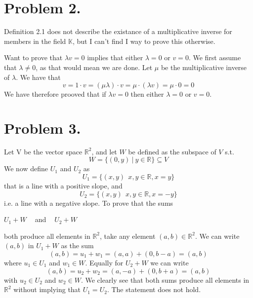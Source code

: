 \documentclass[a4paper,11pt,norsk]{article}
\begin{document}
\section*{Problem 2.}
Definition 2.1 does not describe the existance of a multiplicative inverse for members in the field $\mathbb{K}$, but 
I can't find I way to prove this otherwise.

Want to prove that $\lambda v = 0$ implies that either $\lambda = 0$ or $v = 0$. We first assume that $\lambda \neq 0$, as that 
would mean we are done. Let $\mu$ be the multiplicative inverse of $\lambda$. We have that 
$$v = 1 \cdot v = (\mu \lambda) \cdot v = \mu \cdot (\lambda v) = \mu \cdot 0 = 0$$
We have therefore prooved that if $\lambda v = 0$ then either $\lambda = 0$ or $v = 0$.

\section*{Problem 3.}
Let V be the vector space $\mathbb{R}^2$, and let $W$ be defined as the subspace of $V$ s.t. 
$$W = \{(0, y) \:|\: y \in \mathbb{R}\} \subseteq V$$
We now define $U_1$ and $U_2$ as 
$$U_1 = \{ (x, y) \:\: x, y \in \mathbb{R}, x = y \}$$
that is a line with a positive slope, and 
$$U_2 = \{ (x, y) \:\: x, y \in \mathbb{R}, x = -y \}$$
i.e. a line with a negative slope. To prove that the sums
\begin{center}
    $U_1 + W\:\:\:\:$ and $\:\:\:\:U_2 + W$
\end{center}
both produce all elements in $\mathbb{R}^2$, take any element $(a, b) \in \mathbb{R}^2$. 
We can write $(a, b)$ in $U_1 + W$ as the sum
$$(a, b) = u_1 + w_1 = (a, a) + (0, b - a) = (a, b)$$
where $u_1 \in U_1$ and $w_1 \in W$. Equally for $U_2 + W$ we can write
$$(a, b) = u_2 + w_2 = (a, -a) + (0, b + a) = (a, b)$$
with $u_2 \in U_2$ and $w_2 \in W$. We clearly see that both sums produce all 
elements in $\mathbb{R}^2$ without implying that $U_1 = U_2$. The statement does not hold.
\end{document}
